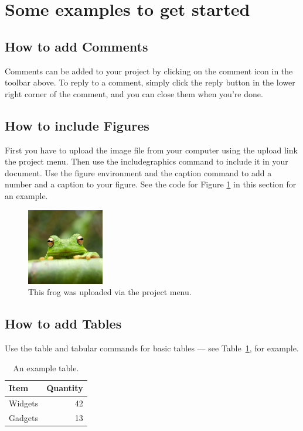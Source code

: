 \documentclass[a4paper]{article}
\begin{document}
\section{Some examples to get started}

\subsection{How to add Comments}

Comments can be added to your project by clicking on the comment icon in the toolbar above. %
%
%
To reply to a comment, simply click the reply button in the lower right corner of the comment, and you can close them when you're done.

\subsection{How to include Figures}

First you have to upload the image file from your computer using the upload link the project menu. Then use the includegraphics command to include it in your document. Use the figure environment and the caption command to add a number and a caption to your figure. See the code for Figure \ref{fig:frog} in this section for an example.

\begin{figure}
\centering
\includegraphics[width=0.3\textwidth]{images/frog.jpg}
\caption{\label{fig:frog}This frog was uploaded via the project menu.}
\end{figure}

\subsection{How to add Tables}

Use the table and tabular commands for basic tables --- see Table~\ref{tab:widgets}, for example. 

\begin{table}
\centering
\begin{tabular}{l|r}
Item & Quantity \\\hline
Widgets & 42 \\
Gadgets & 13
\end{tabular}
\caption{\label{tab:widgets}An example table.}
\end{table}
\end{document}
